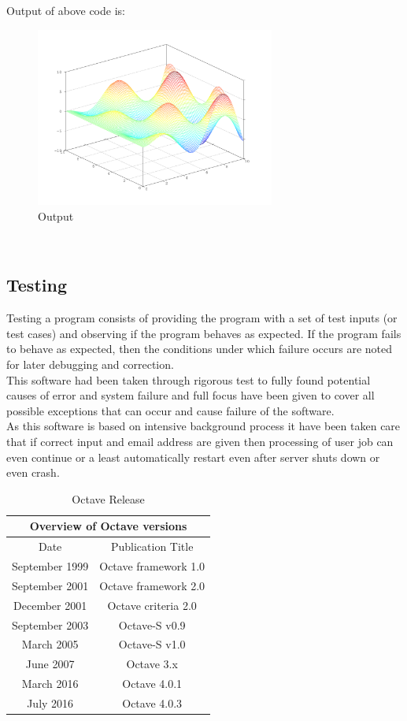 Output of above code is: \\
\begin{figure}[!ht]
	\centering
	\includegraphics[width=0.7\textwidth]{input/images/plot2.png}                
	\caption{Output}
	\hspace{-1.5em}
\end{figure}\\
\subsection{Testing}
Testing a program consists of providing the program with a set of test inputs (or test cases) and
observing if the program behaves as expected. If the program fails to behave as expected, then the
conditions under which failure occurs are noted for later debugging and correction. \\
This software had been taken through rigorous test to fully found potential causes of error and system failure
and full focus have been given to cover all possible exceptions that can 
occur and cause failure of the software.\\
As this software is based on intensive background process it have been taken care that 
if correct input and email address are given then processing of user job can even continue or a least automatically 
restart even after server shuts down or even crash.

\begin{table}[h]
\centering
\begin{tabular}{ ||c|c|| }
\hline
 \multicolumn{2}{||c||}{Overview of Octave versions} \\
 \hline
 Date & Publication Title \\ [0.5ex] 
 \hline \hline
	September 1999 & Octave framework 1.0 \\ \hline
	September 2001 & Octave framework 2.0 \\ \hline
	December 2001 & Octave criteria 2.0\\ \hline
	September 2003 & Octave-S v0.9 \\ \hline
	March 2005 & Octave-S v1.0 \\ \hline
	June 2007 & Octave 3.x\\ \hline
        March 2016 &  Octave 4.0.1        \\ \hline
	July 2016 & Octave 4.0.3 \\ [1ex]
 \hline
\end{tabular}
\caption{Octave Release}
\label{table2}
\end{table}


